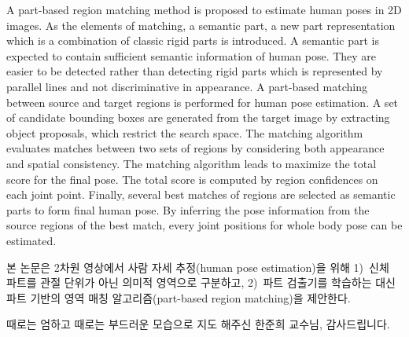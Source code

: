 \documentclass[master,english,final]{postech-ucs}
\begin{document}
A part-based region matching method is proposed to estimate human poses in 2D images. As the elements of matching, a semantic part, a new part representation which is a combination of classic rigid parts is introduced. A semantic part is expected to contain sufficient semantic information of human pose. They are easier to be detected rather than detecting rigid parts which is represented by parallel lines and not discriminative in appearance.
A part-based matching between source and target regions is performed for human pose estimation. A set of candidate bounding boxes are generated from the target image by extracting object proposals, which restrict the search space. The matching algorithm evaluates matches between two sets of regions by considering both appearance and spatial consistency. The matching algorithm leads to maximize the total score for the final pose. The total score is computed by region confidences on each joint point. Finally, several best matches of regions are selected as semantic parts to form final human pose. By inferring the pose information from the source regions of the best match, every joint positions for whole body pose can be estimated.



\begin{summarykorean}
본 논문은 2차원 영상에서 사람 자세 추정(human pose estimation)을 위해 1)~신체 파트를 관절 단위가 아닌 의미적 영역으로 구분하고, 2)~파트 검출기를 학습하는 대신 파트 기반의 영역 매칭 알고리즘(part-based region matching)을 제안한다.

	
\end{summarykorean}






\acknowledgement[korean]

    때로는 엄하고 때로는 부드러운 모습으로 지도 해주신 한준희 교수님, 감사드립니다.
\curriculumvitae[korean]

    \begin{personaldata}
    \end{personaldata}
\end{document}
